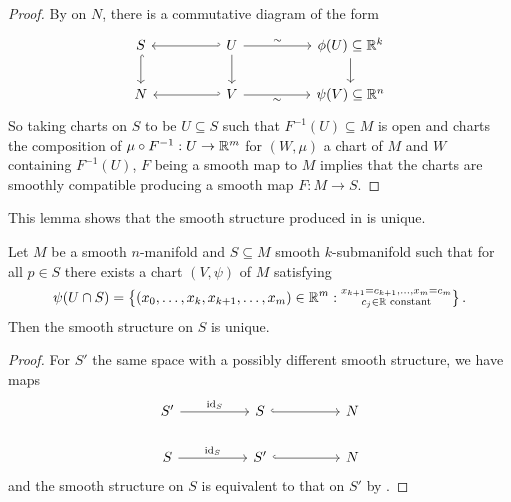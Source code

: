 \begin{proof}
    By  on $N$, there is a commutative diagram of the form 
    $$%
    \begin{tikzcd}
        S && U && {\phi(U)\subseteq\RR^{k}} \\
        N && V && {\psi(V)\subseteq\RR^{n}}
        \arrow[hook, from=1-1, to=2-1]
        \arrow[hook', from=1-3, to=1-1]
        \arrow["\sim", from=1-3, to=1-5]
        \arrow[from=1-3, to=2-3]
        \arrow[from=1-5, to=2-5]
        \arrow[hook', from=2-3, to=2-1]
        \arrow["\sim"', from=2-3, to=2-5]
    \end{tikzcd}$$  
    So taking charts on $S$ to be $U\subseteq S$ such that $F^{-1}(U)\subseteq M$ is open and charts the composition of $\mu\circ F^{-1}:U\to\mathbb{R}^{m}$ for $(W,\mu)$ a chart of $M$ and $W$ containing $F^{-1}(U)$, $F$ being a smooth map to $M$ implies that the charts are smoothly compatible producing a smooth map $F:M\to S$. 
\end{proof}
This lemma shows that the smooth structure produced in  is unique. 
\begin{proposition}\label{prop: unique smooth structure}
    Let $M$ be a smooth $n$-manifold and $S\subseteq M$ smooth $k$-submanifold such that for all $p\in S$ there exists a chart $(V,\psi)$ of $M$ satisfying 
    $$\psi(U\cap S)=\left\{(x_{0},\dots,x_{k},x_{k+1},\dots,x_{m})\in\mathbb{R}^{m}:\substack{x_{k+1}=c_{k+1},\dots,x_{m}=c_{m}\\c_{j}\in\mathbb{R}\text{ constant}}\right\}.$$
    Then the smooth structure on $S$ is unique. 
\end{proposition}
\begin{proof}
    For $S'$ the same space with a possibly different smooth structure, we have maps
    $$%
    \begin{tikzcd}
        {S'} && S && N \\
        S && {S'} && N
        \arrow["{\id_{S}}", from=1-1, to=1-3]
        \arrow[hook, from=1-3, to=1-5]
        \arrow["{\id_{S}}", from=2-1, to=2-3]
        \arrow[hook, from=2-3, to=2-5]
    \end{tikzcd}$$
    and the smooth structure on $S$ is equivalent to that on $S'$ by .
\end{proof}
